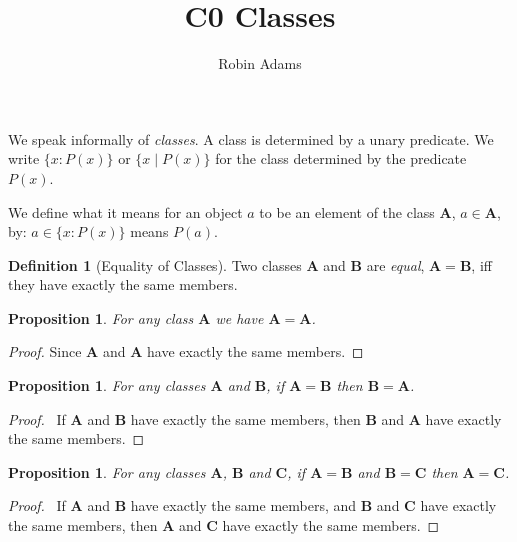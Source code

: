 \documentclass{article}
\title{C0 Classes}
\author{Robin Adams}
\let\qed\relax
\newtheorem{proposition}[axiom]{Proposition}
\theoremstyle{definition}
\newtheorem{definition}[axiom]{Definition}
\begin{document}
    \maketitle

    We speak informally of \emph{classes}. A class is determined by a unary predicate. We write 
    $\{ x : P(x) \}$ or $\{ x \mid P(x) \}$ for the class determined by the predicate $P(x)$.

    We define what it means for an object $a$ to be an element of the class $\mathbf{A}$, $a \in \mathbf{A}$,
    by: $a \in \{ x : P(x) \}$ means $P(a)$.

    \begin{definition}[Equality of Classes]
        Two classes $\mathbf{A}$ and $\mathbf{B}$ are \emph{equal}, $\mathbf{A} = \mathbf{B}$,
        iff they have exactly the same members.
    \end{definition}

    \begin{proposition}
        For any class $\mathbf{A}$ we have $\mathbf{A} = \mathbf{A}$.
    \end{proposition}

    \begin{proof}
        Since $\mathbf{A}$ and $\mathbf{A}$ have exactly the same members.
    \end{proof}

    \begin{proposition}
        For any classes $\mathbf{A}$ and $\mathbf{B}$, if $\mathbf{A} = \mathbf{B}$ then $\mathbf{B} =
        \mathbf{A}$.
    \end{proposition}

    \begin{proof}
        \pf\ If $\mathbf{A}$ and $\mathbf{B}$ have exactly the same members, then $\mathbf{B}$
        and $\mathbf{A}$ have exactly the same members.
    \end{proof}

    \begin{proposition}
        For any classes $\mathbf{A}$, $\mathbf{B}$ and $\mathbf{C}$, if $\mathbf{A} = \mathbf{B}$
        and $\mathbf{B} = \mathbf{C}$ then $\mathbf{A} = \mathbf{C}$.
    \end{proposition}

    \begin{proof}
        \pf\ If $\mathbf{A}$ and $\mathbf{B}$ have exactly the same members,
        and $\mathbf{B}$ and $\mathbf{C}$ have exactly the same members,
        then $\mathbf{A}$ and $\mathbf{C}$ have exactly the same members. \qed
    \end{proof}
\end{document}

